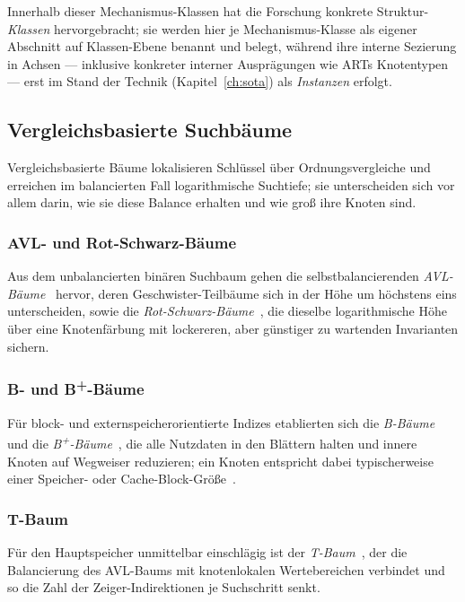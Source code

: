 Innerhalb dieser Mechanismus-Klassen hat die Forschung konkrete Struktur-\emph{Klassen}
hervorgebracht; sie werden hier je Mechanismus-Klasse als eigener Abschnitt auf Klassen-Ebene
benannt und belegt, während ihre interne Sezierung in Achsen --- inklusive konkreter interner
Ausprägungen wie ARTs Knotentypen --- erst im Stand der Technik (Kapitel~\ref{ch:sota}) als
\emph{Instanzen} erfolgt.

\subsection{Vergleichsbasierte Suchbäume}\label{ssec:comparison-trees}
Vergleichsbasierte Bäume lokalisieren Schlüssel über Ordnungsvergleiche und erreichen im
balancierten Fall logarithmische Suchtiefe; sie unterscheiden sich vor allem darin, wie sie diese
Balance erhalten und wie groß ihre Knoten sind.

\subsubsection{AVL- und Rot-Schwarz-Bäume}
Aus dem unbalancierten binären Suchbaum gehen die selbstbalancierenden
\emph{AVL-Bäume}~\cite{adelsonvelsky1962avl} hervor, deren Geschwister-Teilbäume sich in der Höhe um
höchstens eins unterscheiden, sowie die
\emph{Rot-Schwarz-Bäume}~\cite{bayer1972symmetric,guibas1978redblack}, die dieselbe logarithmische
Höhe über eine Knotenfärbung mit lockereren, aber günstiger zu wartenden Invarianten sichern.

\subsubsection{B- und B\texorpdfstring{\textsuperscript{+}}{+}-Bäume}
Für block- und externspeicherorientierte Indizes etablierten sich die
\emph{B-Bäume}~\cite{bayer1972btree} und die
\emph{B\textsuperscript{+}-Bäume}~\cite{comer1979btree}, die alle Nutzdaten in den Blättern halten
und innere Knoten auf Wegweiser reduzieren; ein Knoten entspricht dabei typischerweise einer
Speicher- oder Cache-Block-Größe~\cite{graefe2001btree,hankins2003nodesize}.

\subsubsection{T-Baum}
Für den Hauptspeicher unmittelbar einschlägig ist der \emph{T-Baum}~\cite{lehman1986ttree}, der die
Balancierung des AVL-Baums mit knotenlokalen Wertebereichen verbindet und so die Zahl der
Zeiger-Indirektionen je Suchschritt senkt.

